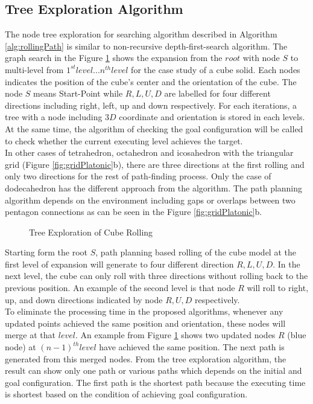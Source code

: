 \subsection{Tree Exploration Algorithm}
The node tree exploration for searching algorithm described in Algorithm \ref{alg:rollingPath} is similar to non-recursive depth-first-search algorithm. The graph search in the Figure \ref{fig:nodeTree} shows the expansion from the $root$ with node $S$ to multi-level from $1^{st} level ... n^{th} level$ for the case study of a cube solid.
%
Each nodes indicates the position of the cube's center and the orientation of the cube. The node $S$ means Start-Point while $R,L,U,D$ are labelled for four different directions including right, left, up and down respectively. 
%
For each iterations, a tree with a node including $3D$ coordinate and orientation is stored in each levels. At the same time, the algorithm of checking the goal configuration will be called to check whether the current executing level achieves the target.\\


\noindent In other cases of tetrahedron, octahedron and icosahedron with the triangular grid (Figure \ref{fig:gridPlatonic}b), there are three directions at the first rolling and only two directions for the rest of path-finding process.
%
Only the case of dodecahedron has the different approach from the algorithm. The path planning algorithm depends on the environment including gaps or overlaps between two pentagon connections as can be seen in the Figure \ref{fig:gridPlatonic}b.
%
\vskip 0.5cm
\begin{figure}[h]
	
	\caption{Tree Exploration of Cube Rolling}
\label{fig:nodeTree}
\end{figure}

\noindent Starting form the root $S$, path planning based rolling of the cube model at the first level of expansion will generate to four different direction $R,L,U,D$. In the next level, the cube can only roll with three directions without rolling back to the previous position.  
An example of the second level is that node $R$ will roll to right, up, and down directions indicated by node $R,U,D$ respectively.\\
% 

\noindent To eliminate the processing time in the proposed algorithms, whenever any updated points achieved the same position and orientation, these nodes will merge at that $level$. An example from Figure \ref{fig:nodeTree} shows two updated nodes $R$ (blue node) at $(n-1)^{th} level$ have achieved the same position. The next path is generated from this merged nodes. 
%
From the tree exploration algorithm, the result can show only one path or various paths which depends on the initial and goal configuration. The first path is the shortest path because the executing time is shortest based on the condition of achieving goal configuration.
% 
%	
%
\clearpage
\newpage